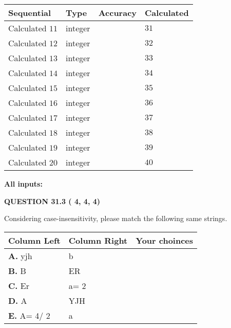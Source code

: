 \documentclass[12pt]{article}
\begin{document}
  
\noindent\begin{tabular}{|l|l|l|l|}
\hline
 Sequential & Type & Accuracy & Calculated \\ 
\hline
 
 
  Calculated $          11$ & integer &  & 
  $ 31 $ 
 \\  \hline  
 
 
  Calculated $          12$ & integer &  & 
  $ 32 $ 
 \\  \hline  
 
 
  Calculated $          13$ & integer &  & 
  $ 33 $ 
 \\  \hline  
 
 
  Calculated $          14$ & integer &  & 
  $ 34 $ 
 \\  \hline  
 
 
  Calculated $          15$ & integer &  & 
  $ 35 $ 
 \\  \hline  
 
 
  Calculated $          16$ & integer &  & 
  $ 36 $ 
 \\  \hline  
 
 
  Calculated $          17$ & integer &  & 
  $ 37 $ 
 \\  \hline  
 
 
  Calculated $          18$ & integer &  & 
  $ 38 $ 
 \\  \hline  
 
 
  Calculated $          19$ & integer &  & 
  $ 39 $ 
 \\  \hline  
 
 
  Calculated $          20$ & integer &  & 
  $ 40 $ 
 \\  \hline  
 \end{tabular}
   
   
   
   
\noindent\vspace{0.1in}\hspace{-0.08in} {\textbf{\Large{All inputs: }}}
   
   
  
\vspace{0.2in}
  
{\textbf{\Large{QUESTION
31.3 
 (          4,          4,          4)
}}}
  
  
Considering case-insensitivity, please match the following same strings.
  
  
\begin{tabular}{|l|l|l|}
 \hline
 Column Left & Column Right  & Your choinces \\ 
 \hline
{\textbf{\large{
A.}}}
yjh
  & 
b
 & 
 \\ 
 \hline
{\textbf{\large{
B.}}}
B
  & 
ER
 & 
 \\ 
 \hline
{\textbf{\large{
C.}}}
Er
  & 
 a= %
2
 & 
 \\ 
 \hline
{\textbf{\large{
D.}}}
A
  & 
YJH
 & 
 \\ 
 \hline
{\textbf{\large{
E.}}}
 A= %
4/ %
2

  & 
a
 & 
 \\ 
 \hline
 \end{tabular}
  
\end{document}
